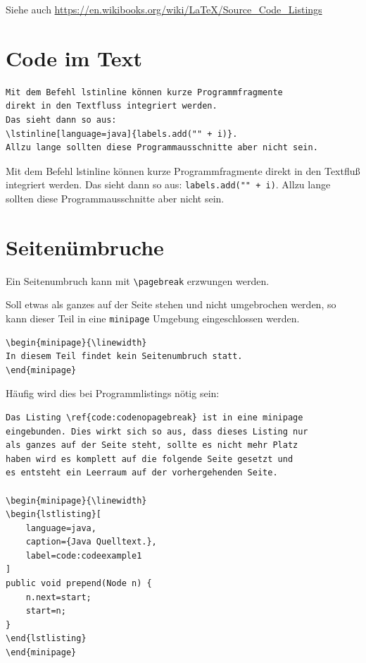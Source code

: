 Siehe auch \url{https://en.wikibooks.org/wiki/LaTeX/Source_Code_Listings}

\section{Code im Text}

\begin{minipage}[t]{\linewidth}
\begin{Verbatim}[frame=single]
Mit dem Befehl lstinline können kurze Programmfragmente 
direkt in den Textfluss integriert werden.
Das sieht dann so aus: 
\lstinline[language=java]{labels.add("" + i)}.
Allzu lange sollten diese Programmausschnitte aber nicht sein.
\end{Verbatim}
\end{minipage}

Mit dem Befehl lstinline können kurze Programmfragmente 
direkt in den Textfluß integriert werden.
Das sieht dann so aus: 
\lstinline{labels.add("" + i)}.
Allzu lange sollten diese Programmausschnitte aber nicht sein.


\section{Seitenümbruche}

Ein Seitenumbruch kann mit \lstinline{\pagebreak} erzwungen werden.

Soll etwas als ganzes auf der Seite stehen und nicht umgebrochen werden, so kann dieser Teil in eine \lstinline{minipage} Umgebung eingeschlossen werden.

\begin{Verbatim}[frame=single]
\begin{minipage}{\linewidth}
In diesem Teil findet kein Seitenumbruch statt.
\end{minipage}
\end{Verbatim}

Häufig wird dies bei Programmlistings nötig sein:

\begin{Verbatim}[frame=single]
Das Listing \ref{code:codenopagebreak} ist in eine minipage 
eingebunden. Dies wirkt sich so aus, dass dieses Listing nur 
als ganzes auf der Seite steht, sollte es nicht mehr Platz 
haben wird es komplett auf die folgende Seite gesetzt und 
es entsteht ein Leerraum auf der vorhergehenden Seite.

\begin{minipage}{\linewidth}
\begin{lstlisting}[
	language=java,
	caption={Java Quelltext.},
	label=code:codeexample1
]
public void prepend(Node n) {
	n.next=start;
	start=n;
}
\end{lstlisting}
\end{minipage}
\end{Verbatim}

